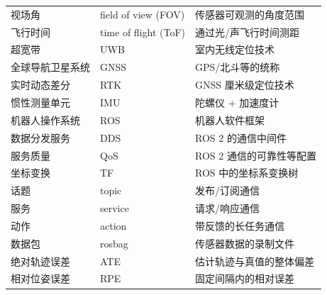 \begin{table}[htbp]
\begin{tabular}{llp{6.6cm}}
    视场角 & field of view (FOV) & 传感器可观测的角度范围 \\
    飞行时间 & time of flight (ToF) & 通过光/声飞行时间测距 \\
    超宽带 & UWB & 室内无线定位技术 \\
    全球导航卫星系统 & GNSS & GPS/北斗等的统称 \\
    实时动态差分 & RTK & GNSS 厘米级定位技术 \\
    惯性测量单元 & IMU & 陀螺仪 + 加速度计 \\
    机器人操作系统 & ROS & 机器人软件框架 \\
    数据分发服务 & DDS & ROS 2 的通信中间件 \\
    服务质量 & QoS & ROS 2 通信的可靠性等配置 \\
    坐标变换 & TF & ROS 中的坐标系变换树 \\
    话题 & topic & 发布/订阅通信 \\
    服务 & service & 请求/响应通信 \\
    动作 & action & 带反馈的长任务通信 \\
    数据包 & rosbag & 传感器数据的录制文件 \\
    绝对轨迹误差 & ATE & 估计轨迹与真值的整体偏差 \\
    相对位姿误差 & RPE & 固定间隔内的相对误差 \\
    \bottomrule
  \end{tabular}
\end{table}
